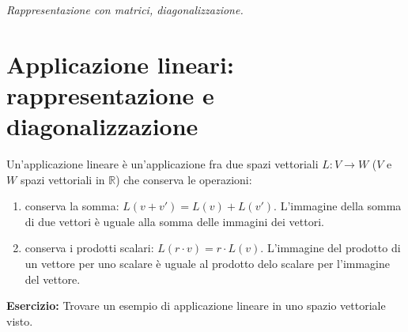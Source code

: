 \begin{center}
\indent
\textit{Rappresentazione con matrici, diagonalizzazione.}
\end{center}

\section{Applicazione lineari: rappresentazione e diagonalizzazione}

Un'applicazione lineare \`e un'applicazione fra due spazi vettoriali $L : V \to W$ ($V$ e $W$ spazi vettoriali in $\mathbb{R}$) che conserva le operazioni:

\begin{enumerate}
    \item conserva la somma: $L (v + v') = L(v) + L(v')$. L'immagine della somma di due vettori \`e uguale alla somma delle immagini dei vettori.
    \item conserva i prodotti scalari: $L(r \cdot v) = r \cdot L(v)$. L'immagine del prodotto di un vettore per uno scalare \`e uguale al prodotto delo scalare per l'immagine del vettore.
\end{enumerate}

\textbf{Esercizio:} Trovare un esempio di applicazione lineare in uno spazio vettoriale visto.